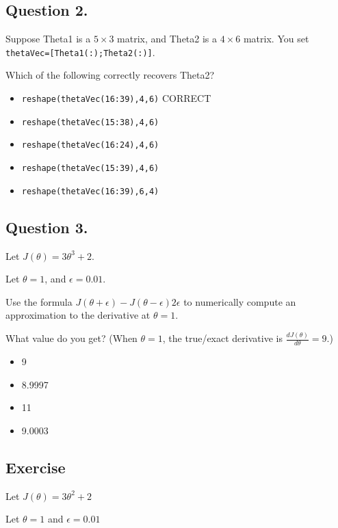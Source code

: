 \documentclass[11pt]{article} %
\begin{document}
\subsection*{ Question 2. }
Suppose Theta1 is a $5\times 3$ matrix, and Theta2 is a $4\times 6$ matrix. You set \texttt{thetaVec=[Theta1(:);Theta2(:)]}. 

Which of the following correctly recovers Theta2?

\begin{itemize}
	\item \texttt{reshape(thetaVec(16:39),4,6)} CORRECT
	
	\item \texttt{reshape(thetaVec(15:38),4,6)}
	
	\item \texttt{reshape(thetaVec(16:24),4,6)}
	
	\item \texttt{reshape(thetaVec(15:39),4,6)}
	
	\item \texttt{reshape(thetaVec(16:39),6,4)}
\end{itemize}
\subsection*{ Question 3. }
 
Let $J(\theta) = 3\theta^3 + 2$. 

Let $\theta=1$, and $\epsilon=0.01$. 

Use the formula $J(\theta+\epsilon)-J(\theta-\epsilon)2\epsilon$ to numerically compute an approximation to the derivative at $\theta=1$. 

What value do you get? (When $\theta=1$, the true/exact derivative is $ \frac{d J(\theta)}{ d\theta}=9$.)

\begin{itemize}
	\item 9
	\item 8.9997
	\item 11
	\item 9.0003
\end{itemize}

\subsection*{Exercise}
Let $ J(\theta) = 3\theta^2 + 2$

Let $\theta = 1$ and $\epsilon = 0.01$
\end{document}
